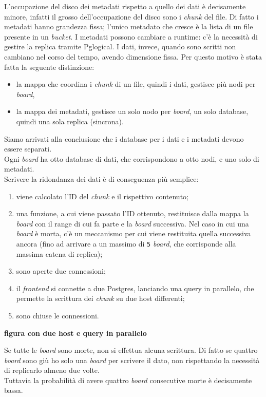 L'occupazione del disco dei metadati rispetto a quello dei dati \`{e} decisamente minore, infatti il grosso dell'occupazione del disco sono i \textit{chunk} del file. Di fatto i metadati hanno grandezza fissa; l'unico metadato che cresce \`{e} la lista di un file presente in un \textit{bucket}. I metadati possono cambiare a runtime: c'\`{e} la necessit\`{a} di gestire la replica tramite Pglogical.
I dati, invece, quando sono scritti non cambiano nel corso del tempo, avendo dimensione fissa. 
Per questo motivo \`{e} stata fatta la seguente distinzione:
\begin{itemize}
\item 
la mappa che coordina i \textit{chunk} di un file, quindi i dati, gestisce pi\`{u} nodi per \textit{board},
\item
la mappa dei metadati, gestisce un solo nodo per \textit{board}, un solo database, quindi una sola replica (sincrona).\\
\end{itemize}

Siamo arrivati alla conclusione che i database per i dati e i metadati devono essere separati.\\
Ogni \textit{board} ha otto database di dati, che corrispondono a otto nodi, e uno solo di metadati.\\
Scrivere la ridondanza dei dati \`{e} di conseguenza pi\`{u} semplice: 
\begin{enumerate}
\item
viene calcolato l'ID del \textit{chunk} e il rispettivo contenuto;
\item
una funzione, a cui viene passato l'ID ottenuto, restituisce dalla mappa la \textit{board} con il range di cui fa parte e la \textit{board} successiva. Nel caso in cui una \textit{board} \`{e} morta, c'\`{e} un meccanismo per cui viene restituita quella successiva ancora (fino ad arrivare a un massimo di \verb"5" \textit{board}, che corrisponde alla massima catena di replica); 
\item 
sono aperte due connessioni;
\item
il \textit{frontend} si connette a due Postgres, lanciando una query in parallelo, che permette la scrittura dei \textit{chunk} su due host differenti;
\item
sono chiuse le connessioni.
\end{enumerate}
\textbf{figura con due host e query in parallelo}

Se tutte le \textit{board} sono morte, non si effettua alcuna scrittura. Di fatto se quattro \textit{board} sono gi\`{u} ho solo una \textit{board} per scrivere il dato, non rispettando la necessit\`{a} di replicarlo almeno due volte.\\
Tuttavia la probabilit\`{a} di avere quattro \textit{board} consecutive morte \`{e} decisamente bassa.\\

